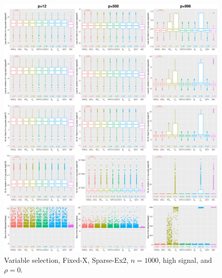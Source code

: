\begin{figure}[!ht]
\centering
\includegraphics[width=\textwidth]{figures/supplement/fixedx/subset_selection/Sparse-Ex2_n1000_hsnr_rho0.eps}
\caption{Variable selection, Fixed-X, Sparse-Ex2, $n=1000$, high signal, and $\rho=0$.}
\end{figure}
\clearpage
